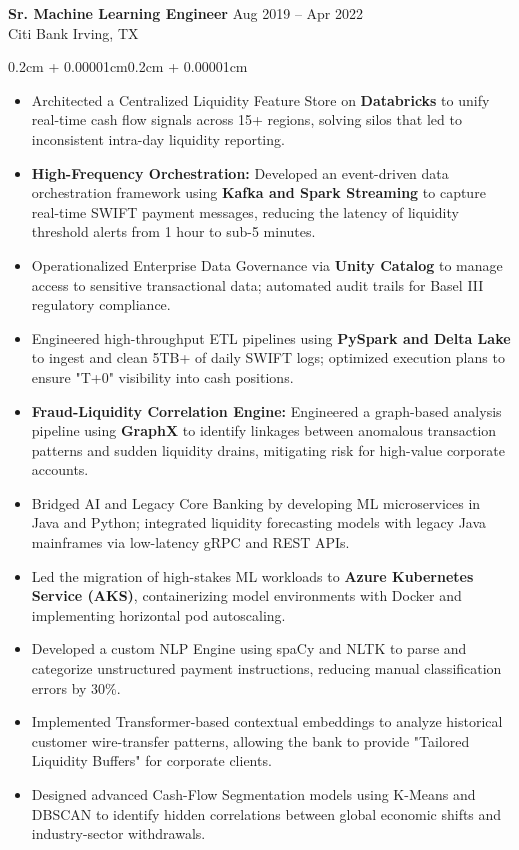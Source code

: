 \documentclass{article}
\newenvironment{highlights}{
    \begin{itemize}[
        topsep=0.10cm, 
        parsep=0.08cm, 
        partopsep=0pt, 
        itemsep=0.08cm, 
        leftmargin=0.4cm + 10pt
    ]
}{
    \end{itemize}
}
\newenvironment{onecolentry}{
    \begin{adjustwidth}{0.2cm + 0.00001cm}{0.2cm + 0.00001cm}
}{
    \end{adjustwidth}
}
\begin{document}
\textbf{Sr. Machine Learning Engineer} \hfill Aug 2019 -- Apr 2022 \\
Citi Bank \hfill Irving, TX
\begin{onecolentry}
    \begin{highlights}
        \item Architected a Centralized Liquidity Feature Store on \textbf{Databricks} to unify real-time cash flow signals across 15+ regions, solving silos that led to inconsistent intra-day liquidity reporting.
        \item \textbf{High-Frequency Orchestration:} Developed an event-driven data orchestration framework using \textbf{Kafka and Spark Streaming} to capture real-time SWIFT payment messages, reducing the latency of liquidity threshold alerts from 1 hour to sub-5 minutes.
        \item Operationalized Enterprise Data Governance via \textbf{Unity Catalog} to manage access to sensitive transactional data; automated audit trails for Basel III regulatory compliance.
        \item Engineered high-throughput ETL pipelines using \textbf{PySpark and Delta Lake} to ingest and clean 5TB+ of daily SWIFT logs; optimized execution plans to ensure "T+0" visibility into cash positions.
        \item \textbf{Fraud-Liquidity Correlation Engine:} Engineered a graph-based analysis pipeline using \textbf{GraphX} to identify linkages between anomalous transaction patterns and sudden liquidity drains, mitigating risk for high-value corporate accounts.
        \item Bridged AI and Legacy Core Banking by developing ML microservices in Java and Python; integrated liquidity forecasting models with legacy Java mainframes via low-latency gRPC and REST APIs.
        \item Led the migration of high-stakes ML workloads to \textbf{Azure Kubernetes Service (AKS)}, containerizing model environments with Docker and implementing horizontal pod autoscaling.
        \item Developed a custom NLP Engine using spaCy and NLTK to parse and categorize unstructured payment instructions, reducing manual classification errors by 30\%.
        \item Implemented Transformer-based contextual embeddings to analyze historical customer wire-transfer patterns, allowing the bank to provide "Tailored Liquidity Buffers" for corporate clients.
        \item Designed advanced Cash-Flow Segmentation models using K-Means and DBSCAN to identify hidden correlations between global economic shifts and industry-sector withdrawals.

\end{highlights}
\end{onecolentry}
\end{document}
